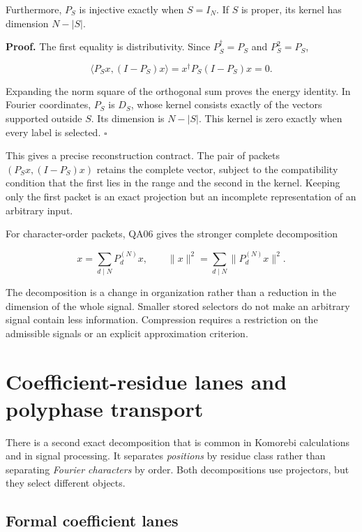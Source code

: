 Furthermore, \(P_S\) is injective exactly when \(S=I_N\). If \(S\) is
proper, its kernel has dimension \(N-|S|\).

\textbf{Proof.} The first equality is distributivity. Since
\(P_S^\dagger=P_S\) and \(P_S^2=P_S\),

\[
\langle P_Sx,(I-P_S)x\rangle
=x^\dagger P_S(I-P_S)x=0.
\]

Expanding the norm square of the orthogonal sum proves the energy
identity. In Fourier coordinates, \(P_S\) is \(D_S\), whose kernel
consists exactly of the vectors supported outside \(S\). Its dimension
is \(N-|S|\). This kernel is zero exactly when every label is selected.
\(\square\)

This gives a precise reconstruction contract. The pair of packets
\((P_Sx,(I-P_S)x)\) retains the complete vector, subject to the
compatibility condition that the first lies in the range and the second
in the kernel. Keeping only the first packet is an exact projection but
an incomplete representation of an arbitrary input.

For character-order packets, QA06 gives the stronger complete
decomposition

\[
x=\sum_{d\mid N}P_d^{(N)}x,
\qquad
\|x\|^2=\sum_{d\mid N}\|P_d^{(N)}x\|^2.
\]

The decomposition is a change in organization rather than a reduction in
the dimension of the whole signal. Smaller stored selectors do not make
an arbitrary signal contain less information. Compression requires a
restriction on the admissible signals or an explicit approximation
criterion.

\hypertarget{coefficient-residue-lanes-and-polyphase-transport}{%
\section{Coefficient-residue lanes and polyphase
transport}\label{coefficient-residue-lanes-and-polyphase-transport}}

There is a second exact decomposition that is common in Komorebi
calculations and in signal processing. It separates \emph{positions} by
residue class rather than separating \emph{Fourier characters} by order.
Both decompositions use projectors, but they select different objects.

\hypertarget{formal-coefficient-lanes}{%
\subsection{Formal coefficient
lanes}\label{formal-coefficient-lanes}}

